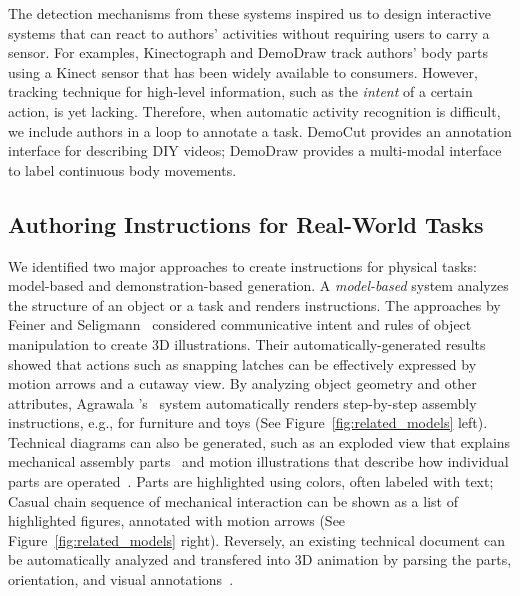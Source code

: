 The detection mechanisms from these systems inspired us to design interactive systems that can react to authors' activities without requiring users to carry  a sensor. For examples, Kinectograph and DemoDraw track authors' body parts using a Kinect sensor that has been widely available to consumers.
%
However, tracking technique for high-level information, such as the \emph{intent} of a certain action, is yet lacking. Therefore, when automatic activity recognition is difficult, we include authors in a loop to annotate a task. DemoCut provides an annotation interface for describing DIY videos; DemoDraw provides a multi-modal interface to label continuous body movements.



\subsection{Authoring Instructions for Real-World Tasks}

We identified two major approaches to create instructions for physical tasks: model-based and demonstration-based generation.
%
A \emph{model-based} system analyzes the structure of an object or a task and renders instructions.
%
The approaches by Feiner and Seligmann~\cite{feiner:1985:AEA:1299975.1300548,Seligmann:1991:AGI:127719.122732} considered communicative intent and rules of object manipulation to create 3D illustrations. Their automatically-generated results showed that actions such as snapping latches can be effectively expressed by motion arrows and a cutaway view.
%
By analyzing object geometry and other attributes, Agrawala \ea{}'s~\cite{agrawala2003designing} system automatically renders step-by-step assembly instructions, e.g., for furniture and toys (See Figure~\ref{fig:related_models} left).
%
Technical diagrams can also be generated, such as an exploded view that explains mechanical assembly parts~\cite{li2008automated} and motion illustrations that describe how individual parts are operated~\cite{mitra2010illustrating}. Parts are highlighted using colors, often labeled with text; Casual chain sequence of mechanical interaction can be shown as a list of highlighted figures, annotated with motion arrows (See Figure~\ref{fig:related_models} right).
%
Reversely, an existing technical document can be automatically analyzed and transfered into 3D animation by parsing the parts, orientation, and visual annotations~\cite{Mohr:2015:RTD:2702123.2702490}.

